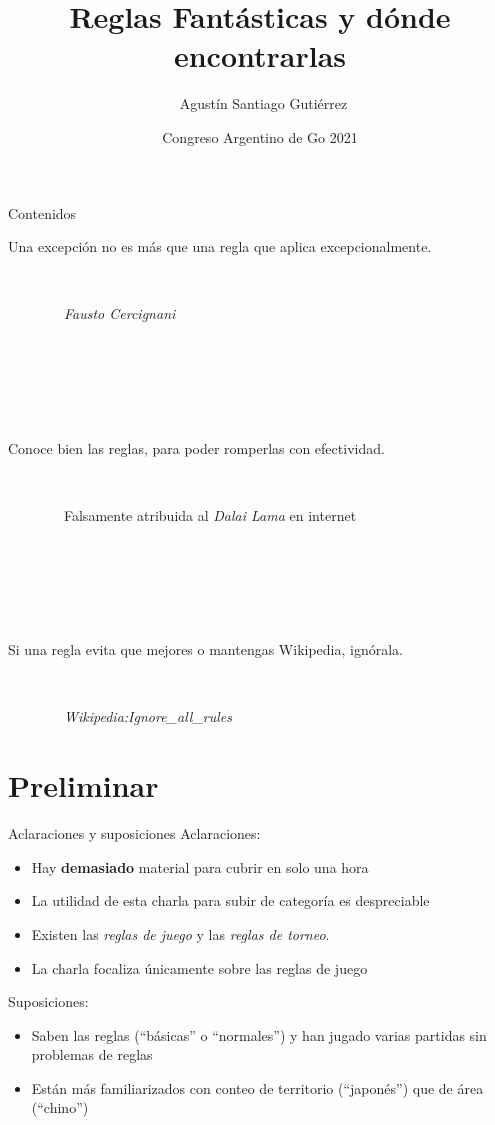 \documentclass{beamer}
\title %
{Reglas Fantásticas y dónde encontrarlas}
\author[Agustín Gutiérrez] %
{~Agustín Santiago Gutiérrez}
\institute[AAGO] %
{
  Asociación Argentina de GO
}
\date[Congreso 2021] %
{Congreso Argentino de Go 2021}
\begin{document}
\begin{frame}
  \titlepage
\end{frame}

\begin{frame}{Contenidos}
  \footnotesize
  \tableofcontents
\end{frame}

\begin{frame}
  Una excepción no es más que una regla que aplica excepcionalmente.
  
  
  \ 
  
  \hfill \ \ \ \ \ \ \ \ \textit{Fausto Cercignani}

  \ 
  
  \ 
  
  \  
  
  Conoce bien las reglas, para poder romperlas con efectividad.
  
  \ 
  
  \hfill \ \ \ \ \ \ \ \ Falsamente atribuida al \textit{Dalai Lama} en internet
  
  \ 
  
  \ 
  
  \ 

  Si una regla evita que mejores o mantengas Wikipedia, ignórala.

  \ 
  
  \hfill \ \ \ \ \ \ \ \ \textit{Wikipedia:Ignore\_all\_rules}
\end{frame}


\section{Preliminar}

\begin{frame}{Aclaraciones y suposiciones}
  Aclaraciones:
  
  \begin{itemize}
  \item Hay \textbf{demasiado} material para cubrir en solo una hora
  \item La utilidad de esta charla para subir de categoría es despreciable
  \item Existen las \textit{reglas de juego} y las \textit{reglas de torneo}. 
  \item La charla focaliza únicamente sobre las reglas de juego
  \end{itemize}
  
  Suposiciones:
  
  \begin{itemize}
  \item Saben las reglas (``básicas'' o ``normales'') y han jugado varias partidas sin problemas de reglas
  \item Están más familiarizados con conteo de territorio (``japonés'') que de área (``chino'')
  \end{itemize}
  
  
\end{frame}
\end{document}
